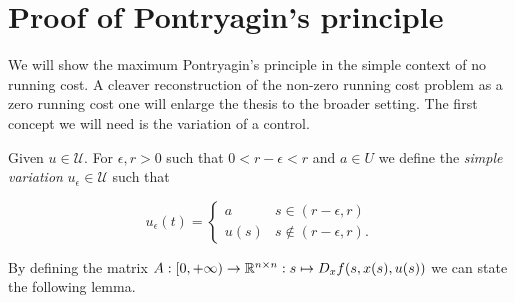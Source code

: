 \section{Proof of Pontryagin's principle}

We will show the maximum Pontryagin's principle in the simple context of no running cost. 
A cleaver reconstruction of the non-zero running cost problem as a zero running cost one 
will enlarge the thesis to the broader setting. The first concept we will need is the variation 
of a control.

\begin{definition}
    Given $u\in\mathcal{U}$. For $\epsilon,r>0$ such that $0<r-\epsilon<r$ and $a\in U$ 
    we define the \textit{simple variation} $u_{\epsilon}\in\mathcal{U}$ such that

    \begin{equation}\label{1-proofpontry-defvar}
        u_{\epsilon}(t) = \begin{cases}
            a & s\in(r-\epsilon,r) \\
            u(s) & s\notin(r-\epsilon,r).
        \end{cases}
    \end{equation}
\end{definition}

By defining the matrix $A:[0,+\infty)\rightarrow\mathbb{R}^{n\times n}: s\mapsto D_xf(s,x(s),u(s))$ we can state 
the following lemma.

